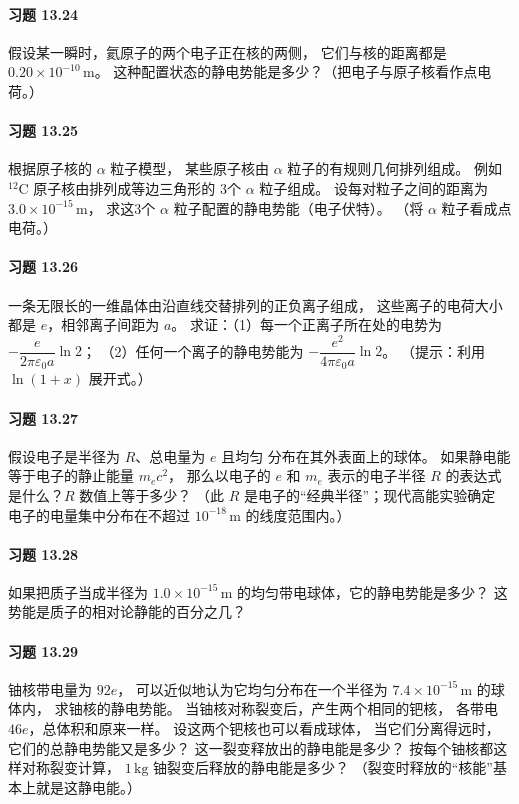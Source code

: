 \paragraph{习题 13.24}
假设某一瞬时，氦原子的两个电子正在核的两侧，
它们与核的距离都是 \(0.20\times10^{-10}\,\mathrm m\)。
这种配置状态的静电势能是多少？（把电子与原子核看作点电荷。）

\paragraph{习题 13.25}
根据原子核的 \(\alpha\) 粒子模型，
某些原子核由 \(\alpha\) 粒子的有规则几何排列组成。
例如 \({}^{12}\mathrm C\) 原子核由排列成等边三角形的
3个 \(\alpha\) 粒子组成。
设每对粒子之间的距离为
\(3.0\times10^{-15}\,\mathrm m\)，
求这3个 \(\alpha\) 粒子配置的静电势能（电子伏特）。
（将 \(\alpha\) 粒子看成点电荷。）

\paragraph{习题 13.26}
一条无限长的一维晶体由沿直线交替排列的正负离子组成，
这些离子的电荷大小都是 \(e\)，相邻离子间距为 \(a\)。
求证：（1）每一个正离子所在处的电势为
\(-\dfrac{e}{2\pi\varepsilon_0a}\ln2\)；
（2）任何一个离子的静电势能为
\(-\dfrac{e^2}{4\pi\varepsilon_0a}\ln2\)。
（提示：利用 \(\ln(1+x)\) 展开式。）

\paragraph{习题 13.27}
假设电子是半径为 \(R\)、总电量为 \(e\) 且均匀
分布在其外表面上的球体。
如果静电能等于电子的静止能量 \(m_ec^2\)，
那么以电子的 \(e\) 和 \(m_e\) 表示的电子半径
\(R\) 的表达式是什么？\(R\) 数值上等于多少？
（此 \(R\) 是电子的“经典半径”；现代高能实验确定
电子的电量集中分布在不超过 \(10^{-18}\,\mathrm m\) 的线度范围内。）

\paragraph{习题 13.28}
如果把质子当成半径为 \(1.0\times10^{-15}\,\mathrm m\)
的均匀带电球体，它的静电势能是多少？
这势能是质子的相对论静能的百分之几？

\paragraph{习题 13.29}
铀核带电量为 \(92e\)，
可以近似地认为它均匀分布在一个半径为
\(7.4\times10^{-15}\,\mathrm m\) 的球体内，
求铀核的静电势能。
当铀核对称裂变后，产生两个相同的钯核，
各带电 \(46e\)，总体积和原来一样。
设这两个钯核也可以看成球体，
当它们分离得远时，它们的总静电势能又是多少？
这一裂变释放出的静电能是多少？
按每个铀核都这样对称裂变计算，
\(1\,\mathrm{kg}\) 铀裂变后释放的静电能是多少？
（裂变时释放的“核能”基本上就是这静电能。）

